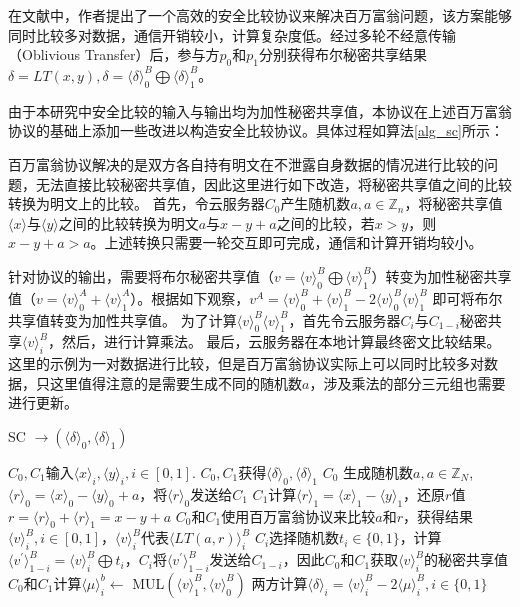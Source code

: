 在文献\cite{rathee2020cryptflow2}中，作者提出了一个高效的安全比较协议来解决百万富翁问题，该方案能够同时比较多对数据，通信开销较小，计算复杂度低。经过多轮不经意传输（Oblivious Transfer）后，参与方$p_0$和$p_1$分别获得布尔秘密共享结果$\delta = LT(x, y) ,\delta = \langle \delta \rangle^B_0 \bigoplus \langle \delta \rangle^B_1$。

由于本研究中安全比较的输入与输出均为加性秘密共享值，本协议在上述百万富翁协议的基础上添加一些改进以构造安全比较协议。具体过程如算法\ref{alg_sc}所示：

百万富翁协议解决的是双方各自持有明文在不泄露自身数据的情况进行比较的问题，无法直接比较秘密共享值，因此这里进行如下改造，将秘密共享值之间的比较转换为明文上的比较。
首先，令云服务器$C_0$产生随机数$a,a\in\mathbb{Z}_n$，将秘密共享值$\langle x \rangle$与$\langle y\rangle$之间的比较转换为明文$a$与$x-y+a$之间的比较，若$x>y$，则$x-y+a>a$。上述转换只需要一轮交互即可完成，通信和计算开销均较小。

针对协议的输出，需要将布尔秘密共享值（$v=\langle v\rangle^B_0 \bigoplus \langle v\rangle^B_1$）转变为加性秘密共享值（$v=\langle v\rangle^A_0+\langle v \rangle^A_1$）。根据如下观察，$v^A=\langle v\rangle^B_0+\langle v\rangle^B_1 - 2\langle v\rangle^B_0 \langle v\rangle^B_1$ 即可将布尔共享值转变为加性共享值。
为了计算$\langle v\rangle^B_0 \langle v\rangle^B_1$，首先令云服务器$C_i$与$C_{1-i}$秘密共享$\langle v \rangle_i^B$，然后，进行计算乘法。
最后，云服务器在本地计算最终密文比较结果。这里的示例为一对数据进行比较，但是百万富翁协议实际上可以同时比较多对数据，只这里值得注意的是需要生成不同的随机数$ a $，涉及乘法的部分三元组也需要进行更新。

\begin{algorithm}[htbp]
	\renewcommand{\algorithmicrequire}{\textbf{输入:}}
	\renewcommand{\algorithmicensure}{\textbf{输出:}}
	\caption{SC $\rightarrow (\langle \delta \rangle_0, \langle \delta \rangle_1)$}
	\label{alg_sc}
	\begin{algorithmic}[1]
		\REQUIRE $C_0,C_1$输入$\langle x \rangle_i, \langle y \rangle_i, i\in [0,1]$.
		\ENSURE $C_0,C_1$获得$\langle \delta\rangle_0, \langle \delta\rangle_1$
		\STATE $C_0$ 生成随机数$a, a\in \mathbb{Z}_N$, $\langle r \rangle_0=\langle x \rangle_0-\langle y\rangle_0+a$，将$\langle r \rangle_0$发送给$C_1$
		\STATE $C_1$计算$\langle r \rangle_1 = \langle x \rangle_1-\langle y\rangle_1$，还原$r$值$r=\langle r \rangle_0 + \langle r \rangle_1 = x-y+a$
		\STATE $C_0$和$C_1$使用百万富翁协议来比较$a$和$r$，获得结果$\langle v \rangle_i^B, i\in[0,1]$，$\langle v \rangle_i^B$代表$\langle LT(a,r)\rangle_i^B$
		\STATE $C_i$选择随机数$t_i \in \{0,1\}$，计算$\langle v^{'}\rangle_{1-i}^B=\langle v \rangle_i^B \bigoplus  t_i$，$C_i$将$\langle v^{'}\rangle_{1-i}^B$发送给$C_{1-i}$，因此$C_0$和$C_1$获取$\langle v \rangle_i^B$的秘密共享值
		\STATE $C_0$和$C_1$计算$\langle\mu \rangle_i^b \leftarrow$ MUL$(\langle v\rangle_1^B,\langle v\rangle_0^B)$
		\STATE 两方计算$ \langle \delta \rangle_i= \langle v \rangle_i^B -  2\langle\mu \rangle_i^B,i\in\{0, 1\}$
		
	\end{algorithmic}
\end{algorithm}
